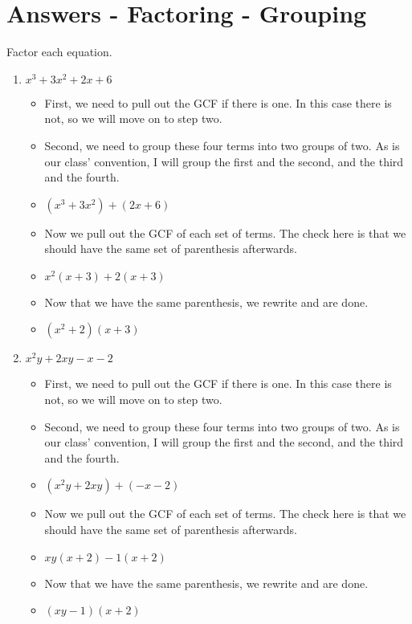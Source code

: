 \section{Answers - Factoring - Grouping}
Factor each equation. \\
\begin{enumerate}
\item $x^{3} + 3x^{2} + 2x + 6$
  \begin{itemize}
  \item First, we need to pull out the GCF if there is one. In this case there is not, so we will move on to step two.
  \item Second, we need to group these four terms into two groups of two. As is our class' convention, I will group the first and the second, and the third and the fourth.
  \item [] $(x^{3}+3x^{2}) +(2x+6)$
  \item Now we pull out the GCF of each set of terms. The check here is that we should have the same set of parenthesis afterwards.
  \item [] $x^{2}(x+3)+2(x+3)$  
  \item Now that we have the same parenthesis, we rewrite and are done.
  \item [] $(x^{2}+2)(x+3)$
  \end{itemize}
\item $x^{2}y + 2xy - x - 2$
  \begin{itemize}
  \item First, we need to pull out the GCF if there is one. In this case there is not, so we will move on to step two.
  \item Second, we need to group these four terms into two groups of two. As is our class' convention, I will group the first and the second, and the third and the fourth.
  \item [] $(x^{2}y+2xy) +(-x-2)$
  \item Now we pull out the GCF of each set of terms. The check here is that we should have the same set of parenthesis afterwards.
  \item [] $xy(x+2)-1(x+2)$
  \item Now that we have the same parenthesis, we rewrite and are done.
  \item [] $(xy-1)(x+2)$

\end{itemize}
\end{enumerate}
